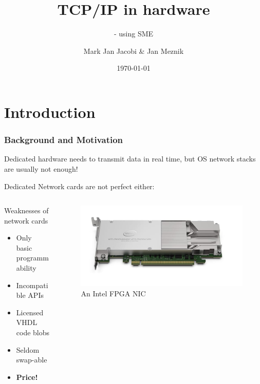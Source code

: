 \documentclass{beamer}
\title{TCP/IP in hardware }
\subtitle{- using SME}
\author{Mark Jan Jacobi \& Jan Meznik}
\institute{University of Copenhagen}
\date{\today}
\begin{document}
\frame{\titlepage}

\section{Introduction}
\begin{frame}
  \frametitle{Background and Motivation}

  Dedicated hardware needs to transmit data in real time, but OS network 
  stacks are usually not enough!

  Dedicated Network cards are not perfect either:
  \begin{columns}

 \begin{column}{0.7\textwidth} 
  \begin{alertblock}{Weaknesses of network cards}
    \begin{itemize}
      \item Only basic programmability
      \item Incompatible APIs 
      \item Licensed VHDL code blobs
      \item Seldom swap-able
      \item \textbf{Price!}
    \end{itemize}
  \end{alertblock}
  \end{column}

  \begin{column}{0.3\textwidth}
    \begin{figure}
    \includegraphics[scale=0.15,angle=270]{intel_fpga_nic.jpg}
    \caption{An Intel FPGA NIC}
    \end{figure}
  \end{column}

\end{columns}


\end{frame}
\end{document}
